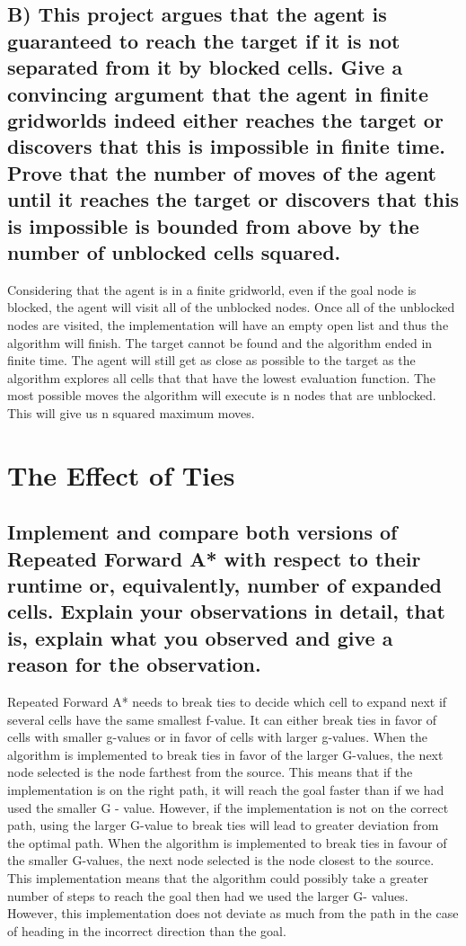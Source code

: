 \documentclass[paper=a4, fontsize=11pt]{scrartcl} %
\begin{document}
\subsection*{ B) This project argues that the agent is guaranteed to reach the target if it is not separated from it by blocked cells.  Give a convincing argument that the agent in finite gridworlds indeed either reaches the target or discovers that this is impossible in finite time. Prove that the number of moves of the agent until it reaches the target or discovers that this is impossible is bounded from above by the number of unblocked cells squared.}

Considering that the agent is in a finite gridworld, even if the goal node is blocked, the agent will visit all of the unblocked nodes. Once all of the unblocked nodes are visited, the implementation will have an empty open list and thus the algorithm will finish. The target cannot be found and the algorithm ended in finite time. The agent will still get as close as possible to the target as the algorithm explores all cells that that have the lowest evaluation function. The most possible moves the algorithm will execute is n nodes that are unblocked. This will give us n squared maximum moves. 




\section{The Effect of Ties}
\subsection*{Implement and compare both versions of Repeated Forward A* with respect to their runtime or,
equivalently, number of expanded cells. Explain your observations in detail, that is, explain what you observed and give a reason for the observation.}

Repeated Forward A* needs to break ties to decide which cell to expand next if
several cells have the same smallest f-value.  It can either break ties in favor of cells with smaller g-values or in favor of cells with larger g-values. \newline
 When the algorithm is implemented to break ties in favor of the larger G-values, the next node selected is the node farthest from the source. This means that if the implementation is on the right path, it will reach the goal faster than if we had used the smaller G - value. However, if the implementation is not on the correct path, using the larger G-value to break ties will lead to greater deviation from the optimal path.  \newline
When the algorithm is implemented to break ties in favour of the smaller G-values, the next node selected is the node closest to the source. This implementation means that the algorithm could possibly take a greater number of steps to reach the goal then had we used the larger G- values. However, this implementation does not deviate as much from the path in the case of heading in the incorrect direction than the goal. 
\end{document}
